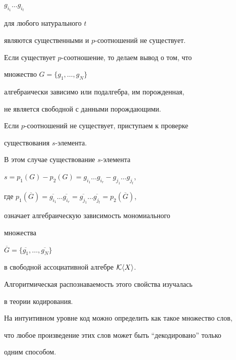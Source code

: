 $g_{i_{1}}\dotsc g_{i_{t}}$


для любого натурального $t$


являются существенными и $p$-соотношений не существует.








Если существует $p$-соотношение, то делаем вывод о том, что


множество $G=\lbrace g_{1},\dotsc,g_{N}\rbrace$


алгебраически зависимо или подалгебра, им порожденная,


не является свободной с данными порождающими.








Если $p$-соотношений не существует, приступаем к проверке


существования $s$-элемента.


В этом случае существование $s$-элемента


$s=p_{1}(G)-p_{2}(G)=g_{i_{1}}\dotsc g_{i_{r}}-g_{j_{1}}\dotsc g_{j_{t}}$,


где $p_{1}(\overline{G})=


\overline{g_{i_{1}}}\dotsc\overline{g_{i_{r}}}=


\overline{g_{j_{1}}}\dotsc\overline{g_{j_{t}}}=


p_{2}(\overline{G})$,


означает алгебраическую зависимость мономиального


множества


$\overline{G}=\lbrace \overline{g_{1}},


\dotsc,\overline{g_{N}}\rbrace$


в свободной ассоциативной алгебре ${\cal K}\langle X\rangle$.


Алгоритмическая распознаваемость этого свойства изучалась


в теории кодирования.








На интуитивном уровне код можно определить как такое множество слов,


что любое произведение этих слов может быть ``декодировано'' только


одним способом.





